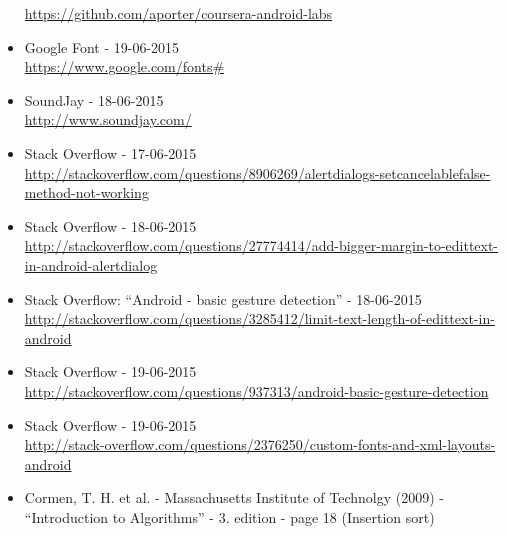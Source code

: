 \begin{itemize}
	\url{https://github.com/aporter/coursera-android-labs}
	\item Google Font - 19-06-2015 \\
	\url{https://www.google.com/fonts#}
	\item SoundJay - 18-06-2015 \\
	\url{http://www.soundjay.com/}
	\item Stack Overflow - 17-06-2015 \\
	\url{http://stackoverflow.com/questions/8906269/alertdialogs-setcancelablefalse-method-not-working}
	\item Stack Overflow - 18-06-2015 \\
	\url{http://stackoverflow.com/questions/27774414/add-bigger-margin-to-edittext-in-android-alertdialog}
	\item Stack Overflow: “Android - basic gesture detection” - 18-06-2015 \\
	\url{http://stackoverflow.com/questions/3285412/limit-text-length-of-edittext-in-android}
	\item Stack Overflow - 19-06-2015 \\
	\url{http://stackoverflow.com/questions/937313/android-basic-gesture-detection}
	\item Stack Overflow - 19-06-2015 \\ \url{http://stack-overflow.com/questions/2376250/custom-fonts-and-xml-layouts-android}
	\item Cormen, T. H. et al. - Massachusetts Institute of Technolgy (2009) - “Introduction to Algorithms” - 3. edition - page 18 (Insertion sort) 
\end{itemize}